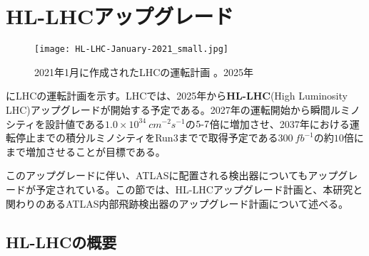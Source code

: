 \section{HL-LHCアップグレード}
\label{sec:HL-LHC}
\begin{figure}[tbp]
  \centering
  \texttt{[image: HL-LHC-January-2021\_small.jpg]}
  \caption[LHCの運転計画]{2021年1月に作成されたLHCの運転計画 \cite{hl-lhc}。2025年 }
  \label{fig:hl-lhc}
\end{figure}

にLHCの運転計画を示す。LHCでは、2025年から\textbf{HL-LHC}(High Luminosity LHC)アップグレードが開始する予定である。2027年の運転開始から瞬間ルミノシティを設計値である$1.0\times 10^{34}\ \si{cm^{-2}s^{-1}}$の$5 \mathchar`- 7$倍に増加させ、2037年における運転停止までの積分ルミノシティをRun3までで取得予定である$300\ \si{fb^{-1}}$の約$10$倍にまで増加させることが目標である。

このアップグレードに伴い、ATLASに配置される検出器についてもアップグレードが予定されている。この節では、HL-LHCアップグレード計画と、本研究と関わりのあるATLAS内部飛跡検出器のアップグレード計画について述べる。

\subsection{HL-LHCの概要}
\label{sec:HL-LHC-gaiyou}

